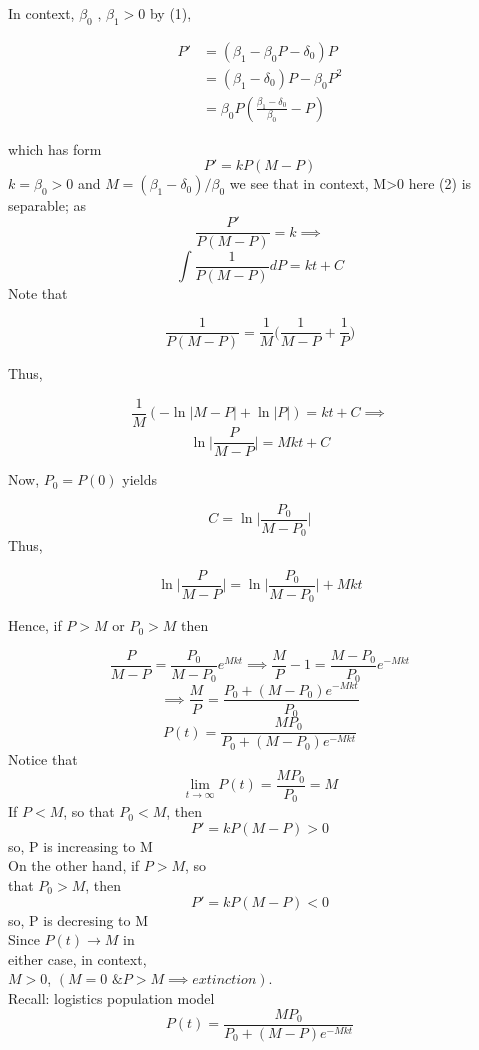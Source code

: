 \documentclass[10pt,a4paper]{article}
\theoremstyle{definition}
\begin{document}
  In context, \( \beta_0 \text{ , } \beta_1 > 0 \) by (1),

  \begin{align*}
    P' &= ( \beta_1 - \beta_0 P -\delta_0 ) P \\
    &= ( \beta_1 - \delta_0 ) P - \beta_0 P^2 \\
    &= \beta_0 P  \left( \frac{ \beta_1-\delta_0}{\beta_0} -P \right)  
  \end{align*}

  which has form 
  \[ P' =  kP(M-P) \]
  \( k = \beta_0 > 0 \) and \( M = (\beta_1 -\delta_0)/ \beta_0  \) we
  see that in context, M>0 here (2) 
  is separable; as 
  \[ \frac{P'}{P(M-P)} =k \implies  \]
  \[ \int \frac{1}{P(M-P)}dP = kt + C \]
  Note that

  \[ \frac{1}{P(M-P)} = \frac{1}{M} \bigg( \frac{1}{M-P} +
  \frac{1}{P}\bigg) \]

  Thus, 

  \[ \frac{1}{M} (- \ln | M-P| + \ln|P|) = kt + C \implies  \]
  \[ \ln \bigg| \frac{P}{M-P} \bigg| = Mkt + C \]

  Now, \( P_0 = P(0) \) yields 

  \[ C = \ln \bigg| \frac{P_0}{M - P_0}\bigg|  \]
  Thus,

  \[ \ln \Big| \frac{P}{M-P} \bigg| = \ln \bigg| \frac{P_0}{M - P_0}\Big| + Mkt\]

  Hence, if \( P > M \) or \( P_0 > M \) then  

  \[  \frac{P}{M-P} = \frac{P_0}{M - P_0} e^{Mkt} \implies \frac{M}{P}
  -1 =  \frac{M - P_0}{P_0} e^{-Mkt}\]
  \[ \implies  \frac{M}{P} = \frac{P_0 + (M-P_0)e^{-Mkt}}{P_0} \]
  \[ \boxed{P(t) = \frac{MP_0}{P_0 + (M-P_0)e^{-Mkt}} } \]
  Notice that
  \[ \lim_{t \to \infty} P(t) = \frac{MP_0}{P_0} = M \]
  If \( P<M \), so that \( P_0 < M \), then
  \[ P' = kP(M-P) > 0 \]
  so, P is increasing to M \\[5mm]
  On the other hand, if \( P > M \), so \\
  that \( P_0>M \), then 
  \[ P' = kP(M-P) <0 \]
  so, P is decresing to M \\
  Since \( P(t) \to M \) in \\
  either case, in context,  \\
  \( M>0 \), \(  ( M = 0 \text{ \& } P>M \implies extinction) \). \\

  \newpage  
  Recall: logistics population model 
  \[ P(t) = \frac{MP_0}{P_0 + (M - P)e^{-Mkt}} \]
\end{document}
